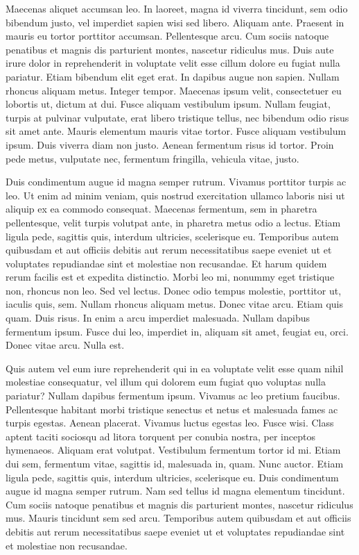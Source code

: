 Maecenas aliquet accumsan leo. In laoreet, magna id viverra tincidunt, sem odio bibendum justo, vel imperdiet sapien wisi sed libero. Aliquam ante. Praesent in mauris eu tortor porttitor accumsan. Pellentesque arcu. Cum sociis natoque penatibus et magnis dis parturient montes, nascetur ridiculus mus. Duis aute irure dolor in reprehenderit in voluptate velit esse cillum dolore eu fugiat nulla pariatur. Etiam bibendum elit eget erat. In dapibus augue non sapien. Nullam rhoncus aliquam metus. Integer tempor. Maecenas ipsum velit, consectetuer eu lobortis ut, dictum at dui. Fusce aliquam vestibulum ipsum. Nullam feugiat, turpis at pulvinar vulputate, erat libero tristique tellus, nec bibendum odio risus sit amet ante. Mauris elementum mauris vitae tortor. Fusce aliquam vestibulum ipsum. Duis viverra diam non justo. Aenean fermentum risus id tortor. Proin pede metus, vulputate nec, fermentum fringilla, vehicula vitae, justo.

Duis condimentum augue id magna semper rutrum. Vivamus porttitor turpis ac leo. Ut enim ad minim veniam, quis nostrud exercitation ullamco laboris nisi ut aliquip ex ea commodo consequat. Maecenas fermentum, sem in pharetra pellentesque, velit turpis volutpat ante, in pharetra metus odio a lectus. Etiam ligula pede, sagittis quis, interdum ultricies, scelerisque eu. Temporibus autem quibusdam et aut officiis debitis aut rerum necessitatibus saepe eveniet ut et voluptates repudiandae sint et molestiae non recusandae. Et harum quidem rerum facilis est et expedita distinctio. Morbi leo mi, nonummy eget tristique non, rhoncus non leo. Sed vel lectus. Donec odio tempus molestie, porttitor ut, iaculis quis, sem. Nullam rhoncus aliquam metus. Donec vitae arcu. Etiam quis quam. Duis risus. In enim a arcu imperdiet malesuada. Nullam dapibus fermentum ipsum. Fusce dui leo, imperdiet in, aliquam sit amet, feugiat eu, orci. Donec vitae arcu. Nulla est.

Quis autem vel eum iure reprehenderit qui in ea voluptate velit esse quam nihil molestiae consequatur, vel illum qui dolorem eum fugiat quo voluptas nulla pariatur? Nullam dapibus fermentum ipsum. Vivamus ac leo pretium faucibus. Pellentesque habitant morbi tristique senectus et netus et malesuada fames ac turpis egestas. Aenean placerat. Vivamus luctus egestas leo. Fusce wisi. Class aptent taciti sociosqu ad litora torquent per conubia nostra, per inceptos hymenaeos. Aliquam erat volutpat. Vestibulum fermentum tortor id mi. Etiam dui sem, fermentum vitae, sagittis id, malesuada in, quam. Nunc auctor. Etiam ligula pede, sagittis quis, interdum ultricies, scelerisque eu. Duis condimentum augue id magna semper rutrum. Nam sed tellus id magna elementum tincidunt. Cum sociis natoque penatibus et magnis dis parturient montes, nascetur ridiculus mus. Mauris tincidunt sem sed arcu. Temporibus autem quibusdam et aut officiis debitis aut rerum necessitatibus saepe eveniet ut et voluptates repudiandae sint et molestiae non recusandae.

